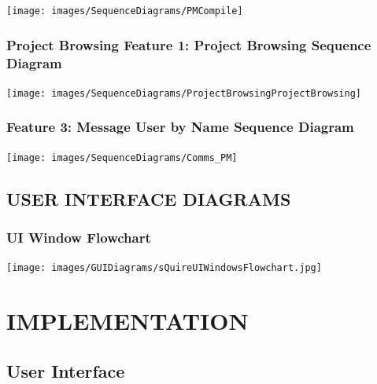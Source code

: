\documentclass[twoside,letterpaper]{article}
\begin{document}
	\bigskip
	
	\texttt{[image: images/SequenceDiagrams/PMCompile]}
	\label{pm:sd1}
	
	\newpage


	\subsubsection[Project Browsing Feature 1: Project Browsing Sequence Diagram]{\rmfamily\bfseries\color{black}
		Project Browsing Feature 1: Project Browsing Sequence Diagram}
	\hypertarget{RefHeading22059017292}{}
	
	\bigskip
	
	\texttt{[image: images/SequenceDiagrams/ProjectBrowsingProjectBrowsing]}
	\label{pb:sd1}
	
	\newpage

	\subsubsection[Communication Feature 3: Message User by Name Sequence Diagram]{\rmfamily\bfseries\color{black}
		Feature 3: Message User by Name Sequence Diagram}
	\hypertarget{RefHeading22059017292}{}
	
	\bigskip
	
	\texttt{[image: images/SequenceDiagrams/Comms\_PM]}
	
	\newpage


\subsection[USER INTERFACE DIAGRAMS]{\rmfamily\bfseries USER INTERFACE DIAGRAMS}
\subsubsection[UI Window Flowchart]{\rmfamily\bfseries\color{black}
	UI Window Flowchart}
\texttt{[image: images/GUIDiagrams/sQuireUIWindowsFlowchart.jpg]}
\newpage

\section[IMPLEMENTATION]{\rmfamily\bfseries\color{black} IMPLEMENTATION}

\subsection{User Interface}
\end{document}

